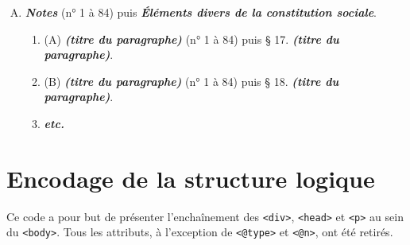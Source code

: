 \begin{enumerate}[A.]
\begin{enumerate}[I.]
\begin{enumerate}[]
            \item \textit{§ 11. Récréations.}
        \end{enumerate}
        \item \textbf{\textit{Histoire de la famille.}}
        \begin{enumerate}[]
            \item \textit{§ 12. Phases principales de l'existence.}
            \item \textit{§ 13. M\oe{}urs et institutions assurant le bien-être physique et moral de la famille.}
        \end{enumerate}
        \item (\textbf{\textit{Budget domestique annuel}}\footnote{Cette section ne possède un titre que dans huit monographies}).
        \begin{enumerate}[]
            \item \textit{§ 14. Budget des recettes de l'année.}
            \item \textit{§ 15. Budget des dépenses de l'année.}
            \item \textit{Comptes annexés aux budgets} \footnotesize{(n° 1 à 84) puis} \textit{§ 16. Comptes annexés aux budgets.}
        \end{enumerate}
    \end{enumerate}
    \item \textbf{\textit{Notes}} \footnotesize{(n° 1 à 84) puis} \textbf{\textit{Éléments divers de la constitution sociale}}.
    \begin{enumerate}[]
            \item (A) \textbf{\textit{(titre du paragraphe)}} \footnotesize{(n° 1 à 84) puis} § 17. \textbf{\textit{(titre du paragraphe)}}.
            \item (B) \textbf{\textit{(titre du paragraphe)}} \footnotesize{(n° 1 à 84) puis} § 18. \textbf{\textit{(titre du paragraphe)}}.
            \item \textbf{\textit{etc.}}
        \end{enumerate}
\end{enumerate}

\clearpage

\renewcommand{\thesection}{B.2}
\section{Encodage de la structure logique}
\label{ann:encodage-structure}

Ce code a pour but de présenter l'enchaînement des \texttt{<div>}, \texttt{<head>} et \texttt{<p>} au sein du \texttt{<body>}. Tous les attributs, à l'exception de \texttt{<@type>} et \texttt{<@n>}, ont été retirés.

